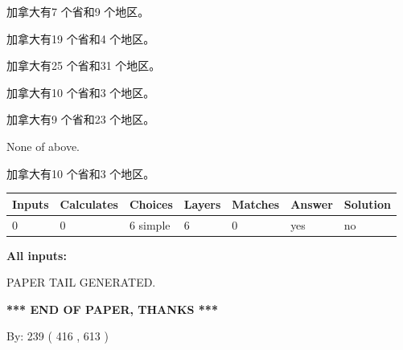 \documentclass{ctexart}
\begin{document}
 
加拿大有7 个省和9 个地区。
 
 
加拿大有19 个省和4 个地区。
 
 
加拿大有25 个省和31 个地区。
 
 
加拿大有10 个省和3 个地区。
 
 
加拿大有9 个省和23 个地区。
 
 
 None of above.
 
 
\noindent{}
 
 
加拿大有10 个省和3 个地区。
 
 
\noindent{}
 
 
   
   
   
   
\noindent\begin{tabular}{|l|l|l|l|l|l|l|}
 \hline
Inputs & Calculates & Choices & Layers & Matches & Answer & Solution \\ \hline
 0  & 
 0  & 
 6
  simple  
  & 
 6  & 
 0  & 
  yes & 
  no 
  \\ \hline
 \end{tabular}
   
   
   
   
\noindent{}
   
   
   
   
\noindent\vspace{0.1in}\hspace{-0.08in} {\textbf{\Large{All inputs: }}}
   
   
   
   
   
   
 \vspace{0.2in}
 
   
   
\vspace{2.0in} PAPER TAIL GENERATED.
   
   
   
   
\vspace{1.0in} 
{\textbf{\large{ *** END OF PAPER, THANKS *** }}} 
   
   
\hspace{1.0in} By: 
 239 ( 416 ,  613 )
   
\end{document}
